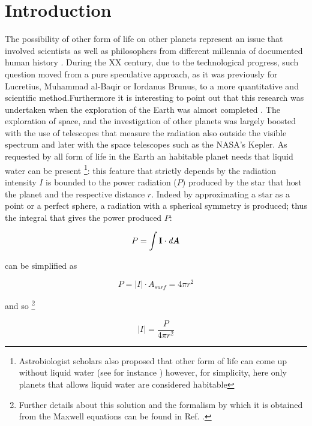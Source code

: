 \documentclass[
12pt, %
a4paper, %
oneside, %
headinclude,footinclude, %
BCOR5mm, %
]{scrartcl}
\begin{document}
\section{Introduction}
The possibility of other form of life on other planets represent an issue that involved scientists as well as philosophers from different millennia of documented human history \cite{papagiannis1985historical}. During the XX century, due to the technological progress, such question moved from a pure speculative approach, as it was previously for Lucretius, Muhammad al-Baqir or Iordanus Brunus, to a more quantitative and scientific method.Furthermore it is interesting to point out that this research was undertaken when the exploration of the Earth was almost completed \cite{fleming2001barrow}. The exploration of space, and the investigation of other planets was largely boosted with the use of telescopes that measure the radiation also outside the visible spectrum and later with the space telescopes such as the NASA's Kepler.
As requested by all form of life in the Earth an habitable planet needs that liquid water can be present \cite{seager2013exoplanet,mckay2014requirements,rothschild2001life}\footnote{Astrobiologist scholars also proposed that other form of life can come up without liquid water (see for instance \cite{rahm2016polymorphism}) however, for simplicity, here only planets that allows liquid water are considered habitable}: this feature that strictly depends by the radiation intensity $I$ is bounded to the power radiation ($P$) produced by the star that host the planet and the respective distance $r$. Indeed by approximating  a star as a point or a perfect sphere, a radiation with a spherical symmetry is produced; thus the integral that gives the power produced $P$: 

\begin{equation}
P=\int \textbf{I}\cdot \textit{d\textbf{A}}
\end{equation}

can be simplified as 

\begin{equation}
P=\lvert I \rvert \cdot A_{surf}=4\pi r^{2}
\end{equation}

and so  \footnote{Further details about this solution and the formalism by which it is obtained from the Maxwell equations can be found in Ref. \cite{feynman}.}

\begin{equation}
\lvert I \rvert=\dfrac{P}{4\pi r^{2}}
\end{equation}
\end{document}
